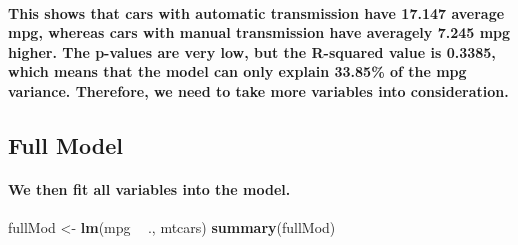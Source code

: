 \documentclass[]{article}
\newenvironment{Shaded}{\begin{snugshade}}{\end{snugshade}}
\newcommand{\KeywordTok}[1]{\textcolor[rgb]{0.13,0.29,0.53}{\textbf{#1}}}
\newcommand{\NormalTok}[1]{#1}
\newcommand{\OperatorTok}[1]{\textcolor[rgb]{0.81,0.36,0.00}{\textbf{#1}}}
\newcommand{\StringTok}[1]{\textcolor[rgb]{0.31,0.60,0.02}{#1}}
\let\oldparagraph\paragraph
\renewcommand{\paragraph}[1]{\oldparagraph{#1}\mbox{}}
\begin{document}
\hypertarget{this-shows-that-cars-with-automatic-transmission-have-17.147-average-mpg-whereas-cars-with-manual-transmission-have-averagely-7.245-mpg-higher.-the-p-values-are-very-low-but-the-r-squared-value-is-0.3385-which-means-that-the-model-can-only-explain-33.85-of-the-mpg-variance.-therefore-we-need-to-take-more-variables-into-consideration.}{%
\paragraph{This shows that cars with automatic transmission have 17.147
average mpg, whereas cars with manual transmission have averagely 7.245
mpg higher. The p-values are very low, but the R-squared value is
0.3385, which means that the model can only explain 33.85\% of the mpg
variance. Therefore, we need to take more variables into
consideration.}\label{this-shows-that-cars-with-automatic-transmission-have-17.147-average-mpg-whereas-cars-with-manual-transmission-have-averagely-7.245-mpg-higher.-the-p-values-are-very-low-but-the-r-squared-value-is-0.3385-which-means-that-the-model-can-only-explain-33.85-of-the-mpg-variance.-therefore-we-need-to-take-more-variables-into-consideration.}}

\hypertarget{full-model}{%
\subsection{Full Model}\label{full-model}}

\hypertarget{we-then-fit-all-variables-into-the-model.}{%
\paragraph{We then fit all variables into the
model.}\label{we-then-fit-all-variables-into-the-model.}}

\begin{Shaded}
\begin{Highlighting}[]
\NormalTok{fullMod <-}\StringTok{ }\KeywordTok{lm}\NormalTok{(mpg }\OperatorTok{~}\StringTok{ }\NormalTok{., mtcars)}
\KeywordTok{summary}\NormalTok{(fullMod)}
\end{Highlighting}
\end{Shaded}
\end{document}
